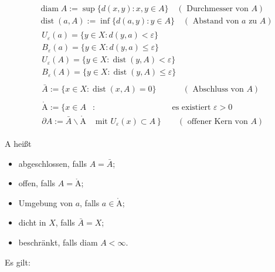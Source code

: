 \documentclass[10pt, letterpaper]{article}
\begin{document}
$$
\begin{aligned}
& \operatorname{diam} A:=\sup \{d(x, y): x, y \in A\} \quad(\text { Durchmesser von } A) \\
& \operatorname{dist}(a, A):=\inf \{d(a, y): y \in A\} \quad(\text { Abstand von } a \text { zu } A) \\
& \begin{array}{lll}
U_{\varepsilon}(a)=\{y \in X: d(y, a)<\varepsilon\} & \\
B_{\varepsilon}(a)=\{y \in X: d(y, a) \leq \varepsilon\} & \\
U_{\varepsilon}(A)=\{y \in X: \operatorname{dist}(y, A)<\varepsilon\} & \\
B_{\varepsilon}(A)=\{y \in X: \operatorname{dist}(y, A) \leq \varepsilon\} & \\
& \\
\bar{A}:=\{x \in X: \operatorname{dist}(x, A)=0\} & (\text { Abschluss von } A)
\end{array} \\
& \begin{array}{lll}
\mathring{\mathrm{A}}:=\{x \in A & : & \text { es existiert } \varepsilon>0 \\
\partial A:=\bar{A} \backslash \mathring{\mathrm{A}} & \text { mit } \left.U_{\varepsilon}(x) \subset A\right\} & \quad(\text { offener Kern von } A)
\end{array}
\end{aligned}
$$

A heißt

\begin{itemize}
  \item abgeschlossen, falls $A=\bar{A}$;
  \item offen, falls $A=\mathring{\mathrm{A}}$;
  \item Umgebung von $a$, falls $a \in \mathring{\mathrm{A}}$;
  \item dicht in $X$, falls $\bar{A}=X$;
  \item beschränkt, falls diam $A<\infty$.
\end{itemize}

Es gilt:
\end{document}
